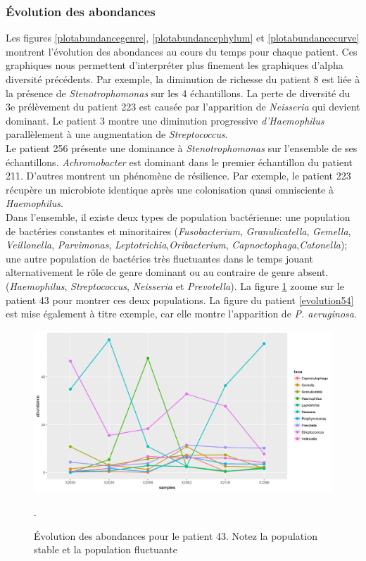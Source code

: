 \documentclass[12pt,a4paper]{article}
\begin{document}
\subsubsection{Évolution des abondances}
Les figures \ref{plotabundancegenre}, \ref{plotabundancephylum} et \ref{plotabundancecurve} montrent l’évolution des abondances au cours du temps pour chaque patient. Ces graphiques nous permettent d’interpréter plus finement les graphiques d’alpha diversité précédents.
Par exemple, la diminution de richesse du patient 8 est liée à la présence de \textit{Stenotrophomonas} sur les 4 échantillons.
La perte de diversité du 3e prélèvement du patient 223 est causée par l'apparition de \textit{Neisseria} qui devient dominant.
Le patient 3 montre une diminution progressive \textit{d’Haemophilus} parallèlement à une augmentation de \textit{Streptococcus}. \\
Le patient 256 présente une dominance à \textit{Stenotrophomonas} sur l'ensemble de ses échantillons. \textit{Achromobacter} est dominant dans le premier échantillon du patient 211.
D’autres montrent un phénomène de résilience. Par exemple, le patient 223 récupère un microbiote identique après une colonisation quasi omnisciente à \textit{Haemophilus}. \\
Dans l’ensemble, il existe deux types de population bactérienne: une population de bactéries constantes et minoritaires (\textit{Fusobacterium}, \textit{Granulicatella}, \textit{Gemella}, \textit{Veillonella}, \textit{Parvimonas}, \textit{Leptotrichia},\textit{Oribacterium}, \textit{Capnoctophaga},\textit{Catonella}); une autre population de bactéries très fluctuantes dans le temps jouant alternativement le rôle de genre dominant ou au contraire de genre absent. (\textit{Haemophilus}, \textit{Streptococcus}, \textit{Neisseria} et \textit{Prevotella}).
La figure \ref{evolution43} zoome sur le patient 43 pour montrer ces deux populations. La figure du patient \ref{evolution54} est mise également à titre exemple, car elle montre l’apparition de \textit{P. aeruginosa}. \\

\begin{figure}
\begin{center}
\includegraphics[scale=0.60]{img/curve_043.png}\hfill
\end{center}
\caption{Évolution des abondances pour le patient 43. Notez la population stable et la population fluctuante}.
\label{evolution43}
\end{figure}
\end{document}

